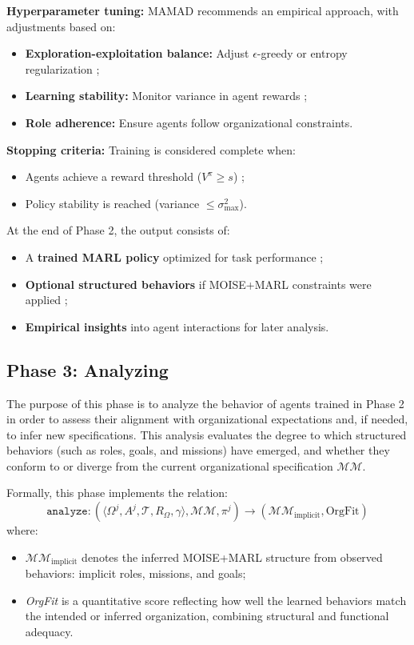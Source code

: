 \documentclass[pdflatex,sn-mathphys-num]{sn-jnl}%
\theoremstyle{thmstyleone}%
\theoremstyle{thmstyletwo}%
\theoremstyle{thmstylethree}%
\begin{document}
\noindent \textbf{Hyperparameter tuning:}
MAMAD recommends an empirical approach, with adjustments based on:
\begin{itemize}
    \item \textbf{Exploration-exploitation balance:} Adjust $\epsilon$-greedy or entropy regularization ;
    \item \textbf{Learning stability:} Monitor variance in agent rewards ;
    \item \textbf{Role adherence:} Ensure agents follow organizational constraints.
\end{itemize}

\noindent \textbf{Stopping criteria:}
Training is considered complete when:
\begin{itemize}
    \item Agents achieve a reward threshold ($V^{\pi} \geq s$) ;
    \item Policy stability is reached (variance $\leq \sigma_{\max}^2$).
\end{itemize}

At the end of Phase 2, the output consists of:
\begin{itemize}
    \item A \textbf{trained MARL policy} optimized for task performance ;
    \item \textbf{Optional structured behaviors} if MOISE+MARL constraints were applied ;
    \item \textbf{Empirical insights} into agent interactions for later analysis.
\end{itemize}


\subsection{Phase 3: Analyzing}

The purpose of this phase is to analyze the behavior of agents trained in Phase 2 in order to assess their alignment with organizational expectations and, if needed, to infer new specifications. This analysis evaluates the degree to which structured behaviors (such as roles, goals, and missions) have emerged, and whether they conform to or diverge from the current organizational specification $\mathcal{MM}$.

Formally, this phase implements the relation:
\[
    \texttt{analyze}: \left( \langle \Omega^j, A^j, \mathcal{T}, R_{\Omega}, \gamma \rangle, \mathcal{MM}, \pi^j \right) \longrightarrow (\mathcal{MM}_{\text{implicit}}, \text{OrgFit})
\]
where:
\begin{itemize}
    \item $\mathcal{MM}_{\text{implicit}}$ denotes the inferred MOISE+MARL structure from observed behaviors: implicit roles, missions, and goals;
    \item \textit{OrgFit} is a quantitative score reflecting how well the learned behaviors match the intended or inferred organization, combining structural and functional adequacy.
\end{itemize}
\end{document}
